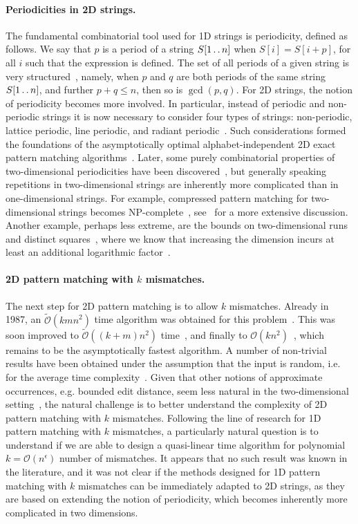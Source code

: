 \documentclass[11pt, letterpaper]{article}
\theoremstyle{plain}
\theoremstyle{definition}
\theoremstyle{remark}
\def\dd{\mathinner{.\,.}}
\renewcommand{\O}{\mathcal{O}}
\newcommand{\tO}{\tilde{\mathcal{O}}}
\begin{document}
\paragraph{Periodicities in 2D strings.} The fundamental combinatorial tool used for 1D strings is periodicity,
defined as follows. We say that $p$ is a period of a string $S[1 \dd n]$ when $S[i]=S[i+p]$, for all $i$ such that the expression is defined.
The set of all periods of a given string is very structured~\cite{Fine1965}, namely, when $p$ and $q$ are both periods
of the same string $S[1 \dd n]$, and further $p+q\leq n$, then so is $\gcd(p,q)$.
For 2D strings, the notion of periodicity becomes more involved. In particular, instead of periodic
and non-periodic strings it is now necessary to consider four types of strings: non-periodic, lattice periodic, line periodic, and
radiant periodic~\cite{Amir1998}. Such considerations formed the foundations of the asymptotically optimal alphabet-independent
2D exact pattern matching algorithms~\cite{Amir1994,Galil1996}.
Later, some purely combinatorial properties of two-dimensional periodicities have been discovered~\cite{Mignosi2003,Gamard2017},
but generally speaking repetitions in two-dimensional strings are inherently more complicated than in one-dimensional strings.
For example, compressed pattern matching for two-dimensional strings becomes NP-complete~\cite{Berman2002}, see~\cite{Rytter2000}
for a more extensive discussion.
Another example, perhaps less extreme, are the bounds on two-dimensional runs~\cite{Amir2020} and
distinct squares~\cite{Charalampopoulos2020}, where we know that increasing the dimension incurs at least an additional
logarithmic factor~\cite{Charalampopoulos2020}.

\paragraph{2D pattern matching with $k$ mismatches.} The next step for 2D pattern matching is to allow $k$ mismatches.
Already in 1987, an $\tO(kmn^{2})$ time algorithm was obtained for this problem~\cite{Krithivasan1987}. This was
soon improved to $\tO((k+m)n^2)$ time~\cite{Ranka1991}, and finally to $\O(kn^2)$~\cite{Amir1991}, which remains
to be the asymptotically fastest algorithm. A number of non-trivial results have been obtained under the assumption
that the input is random, i.e. for the average time complexity~\cite{Baeza-Yates1998,Park1998,Kaerkkaeinen1999}.
Given that other notions of approximate occurrences, e.g. bounded edit distance, seem less natural in the two-dimensional
setting~\cite{Baeza-Yates1998a}, the natural challenge is to better understand the complexity
of 2D pattern matching with $k$ mismatches. Following the line of research for 1D pattern matching with $k$
mismatches, a particularly natural question is to understand if we are able to design a quasi-linear time
algorithm for polynomial $k=\O(n^{\epsilon})$ number of mismatches. It appears that no such result was known
in the literature, and it was not clear if the methods designed for 1D pattern matching with $k$ mismatches
can be immediately adapted to 2D strings, as they are based on extending the notion of periodicity, which becomes
inherently more complicated in two dimensions.
\end{document}

